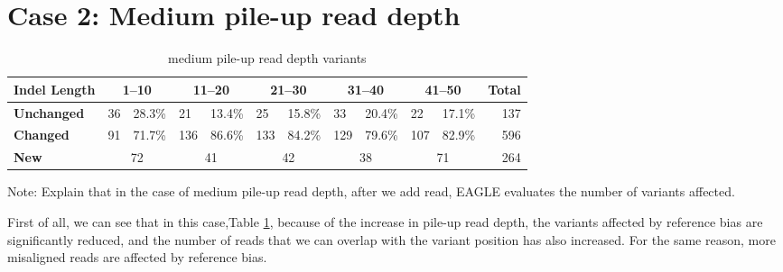 \section{Case 2: Medium pile-up read depth}
\begin{center}
\begin{table}[h]
    \centering
    \caption[medium pile-up read depth variants]{medium pile-up read depth variants}
    \vspace{-0.5cm}
    \begin{tabular}{|l|l|l|l|l|l|l|l|l|l|l|r|}
    \hline
    \textbf{Indel Length} & 
    \multicolumn{2}{c|}{\textbf{1--10}}  & \multicolumn{2}{c|}{\textbf{11--20}}  & \multicolumn{2}{c|}{\textbf{21--30}}  &
    \multicolumn{2}{c|}{\textbf{31--40}}  & \multicolumn{2}{c|}{\textbf{41--50}}   & 
    \textbf{Total}\\\hline
    \rowcolor{lightgray}
    \textbf{Unchanged}  & 
    36 & 28.3\%       &
    21 & 13.4\%     &
    25 & 15.8\%    &
    33 & 20.4\%     &
    22 & 17.1\%          &
    137\\ \hline
    \textbf{Changed} & 
    91 & 71.7\%       &
    136 & 86.6\%     & 
    133 & 84.2\%    & 
    129 & 79.6\%     &
    107 & 82.9\%        &
    596\\ \hline
    \rowcolor{lightgray}    
    \textbf{New}  & 
    \multicolumn{2}{c|}{72}      &
    \multicolumn{2}{c|}{41}     &
    \multicolumn{2}{c|}{42}      &
    \multicolumn{2}{c|}{38}    &
    \multicolumn{2}{c|}{71}       & 
    264\\ \hline
    \end{tabular}
    \label{tab:mid-variants}
    {Note: Explain that in the case of medium pile-up read depth, after we add read, EAGLE evaluates the number of variants affected.}
\end{table}
\end{center}

First of all, we can see that in this case,Table \ref{tab:mid-variants}, because of the increase in pile-up read depth, the variants affected by reference bias are significantly reduced, and the number of reads that we can overlap with the variant position has also increased. For the same reason, more misaligned reads are affected by reference bias.

